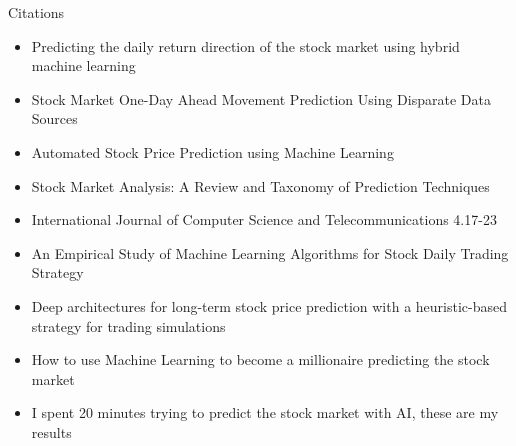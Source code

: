 \documentclass[conference]{IEEEtran}
\begin{document}
Citations
\begin{itemize}
\item Predicting the daily return direction of the stock market using hybrid machine learning\cite{DailyReturnDirection}
\item Stock Market One-Day Ahead Movement Prediction Using Disparate Data Sources\cite {Onedayahead}
\item Automated Stock Price Prediction using Machine Learning \cite{AutomatedPrediction}
\item Stock Market Analysis: A Review and Taxonomy of Prediction Techniques \cite{TaxonomyofPrediction}
\item International Journal of Computer Science and Telecommunications 4.17-23 \cite {MLModelPrediction}
\item An Empirical Study of Machine Learning Algorithms for Stock Daily Trading Strategy \cite{EmpiricalStudy}
\item Deep architectures for long-term stock price prediction with a heuristic-based strategy for trading simulations \cite{LongTermPricePrediction}
\item How to use Machine Learning to become a millionaire predicting the stock market \cite{WebBecomeMillionaire}
\item I spent 20 minutes trying to predict the stock market with AI, these are my results \cite{20MinStockPredict}
\end{itemize}





\vspace{12pt}
\end{document}
